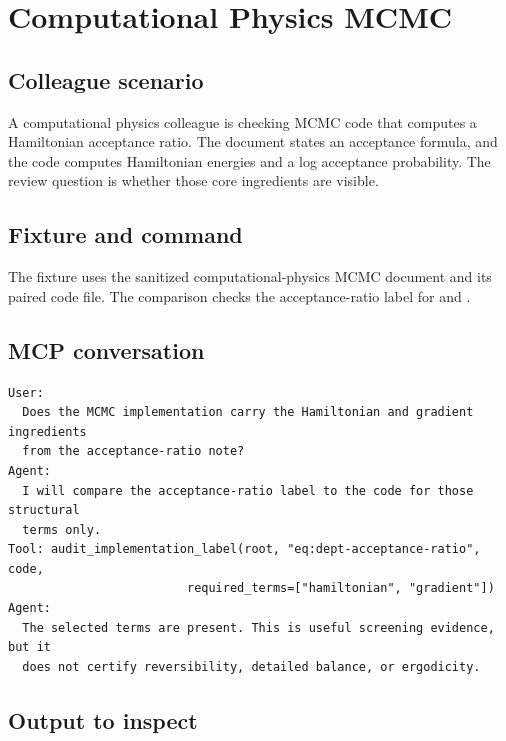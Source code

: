 \documentclass[12pt,a4paper,openany]{book}
\begin{document}
\chapter{Computational Physics MCMC}

\section*{Colleague scenario}

A computational physics colleague is checking MCMC code that computes a
Hamiltonian acceptance ratio. The document states an acceptance formula, and the
code computes Hamiltonian energies and a log acceptance probability. The review
question is whether those core ingredients are visible.

\section*{Fixture and command}

The fixture uses the sanitized computational-physics MCMC document and its
paired code file. The comparison checks the acceptance-ratio label for
 and .

\section*{MCP conversation}

\begin{lstlisting}[basicstyle=\ttfamily\scriptsize]
User:
  Does the MCMC implementation carry the Hamiltonian and gradient ingredients
  from the acceptance-ratio note?
Agent:
  I will compare the acceptance-ratio label to the code for those structural
  terms only.
Tool: audit_implementation_label(root, "eq:dept-acceptance-ratio", code,
                         required_terms=["hamiltonian", "gradient"])
Agent:
  The selected terms are present. This is useful screening evidence, but it
  does not certify reversibility, detailed balance, or ergodicity.
\end{lstlisting}



\section*{Output to inspect}
\end{document}
